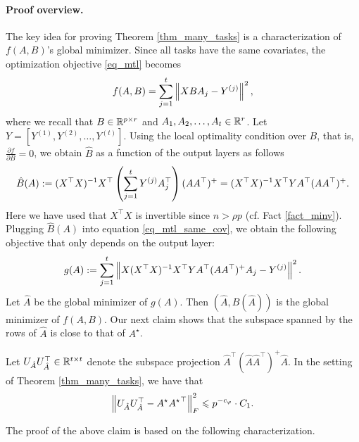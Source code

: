\paragraph{Proof overview.} The key idea for proving Theorem \ref{thm_many_tasks} is a characterization of $f(A, B)$'s global minimizer.
	Since all tasks have the same covariates, the optimization objective \eqref{eq_mtl} becomes
	\begin{align}
		f(A, B) = \sum_{j=1}^t \left\| X B A_j - Y^{(j)} \right\|^2, \label{eq_mtl_same_cov}
	\end{align}
	where we recall that $B \in \mathbb{R}^{p \times r}$ and $A_1, A_2, \dots, A_t \in \mathbb{R}^r$.
	Let $Y = [Y^{(1)}, Y^{(2)}, \dots, Y^{(t)}]$.
	Using the local optimality condition over $B$, that is, $\frac{\partial f}{\partial B} = 0$, we obtain $\hat{B}$ as a function of the output layers as follows
	\begin{align} \label{eq_Bhat}
		\hat{B}(A) := (X^{\top}X)^{-1} X^{\top} \left({\sum_{j=1}^t Y^{(j)} A_j^{\top}}\right) (A  A^{\top})^{+}
		= (X^{\top} X)^{-1} X^{\top} Y A^{\top} (AA^{\top})^{+}.
	\end{align}
	Here we have used that $X^{\top}X$ is invertible since $n > \rho p$ (cf. Fact \ref{fact_minv}).
	Plugging $\hat{B}(A)$ into equation \eqref{eq_mtl_same_cov}, we obtain the following objective that only depends on the output layer:
	\begin{align}
		g(A) := \sum_{j=1}^t \left\| X (X^{\top}X)^{-1}X^{\top} Y A^{\top} (AA^{\top})^{+} A_j - Y^{(j)} \right\|^2. \label{eq_mtl_output_layer}
	\end{align}
	Let $\hat{A}$ be the global minimizer of $g(A)$. Then  $(\hat{A}, \hat{B}(\hat A))$ is the global minimizer of $f(A, B)$. 
	Our next claim shows that the subspace spanned by the rows of $\hat{A}$ is close to that of $A^{\star}$.
	\begin{claim}\label{claim_opt_dist}
		Let $U_{\hat{A}} U_{\hat{A}}^{\top} \in\mathbb{R}^{t\times t}$ denote the subspace projection $\hat{A}^{\top} (\hat{A}\hat{A}^{\top})^{+} \hat{A}$.
		In the setting of Theorem \ref{thm_many_tasks}, we have that
		\[ \left\| U_{\hat{A}} U_{\hat{A}}^{\top} - A^{\star} {A^{\star}}^{\top} \right\|_{F}^2
				\leqslant  p^{-c_{\varphi}} \cdot C_1. \]
	\end{claim}
	The proof of the above claim is based on the following characterization.

